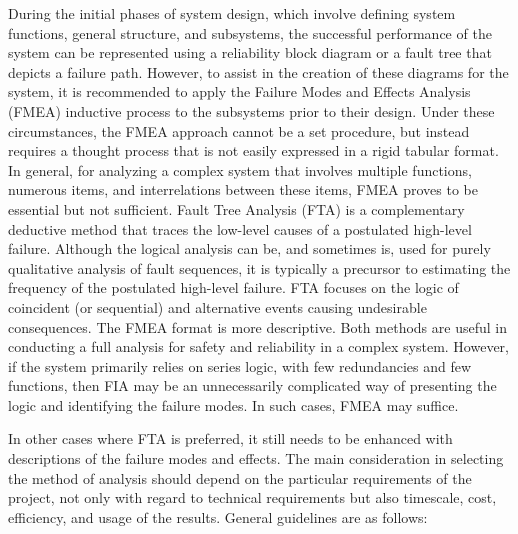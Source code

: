 \documentclass[./dissertation.tex]{subfiles}
\begin{document}
During the initial phases of system design, which involve defining system functions, general structure, and subsystems, the successful performance of the system can be represented using a reliability block diagram or a fault tree that depicts a failure path. However, to assist in the creation of these diagrams for the system, it is recommended to apply the Failure Modes and Effects Analysis (FMEA) inductive process to the subsystems prior to their design. Under these circumstances, the FMEA approach cannot be a set procedure, but instead requires a thought process that is not easily expressed in a rigid tabular format. In general, for analyzing a complex system that involves multiple functions, numerous items, and interrelations between these items, FMEA proves to be essential but not sufficient. Fault Tree Analysis (FTA) is a complementary deductive method that traces the low-level causes of a postulated high-level failure. Although the logical analysis can be, and sometimes is, used for purely qualitative analysis of fault sequences, it is typically a precursor to estimating the frequency of the postulated high-level failure. FTA focuses on the logic of coincident (or sequential) and alternative events causing undesirable consequences. The FMEA format is more descriptive. Both methods are useful in conducting a full analysis for safety and reliability in a complex system. However, if the system primarily relies on series logic, with few redundancies and few functions, then FIA may be an unnecessarily complicated way of presenting the logic and identifying the failure modes. In such cases, FMEA may suffice.

In other cases where FTA is preferred, it still needs to be enhanced with descriptions of the failure modes and effects. The main consideration in selecting the method of analysis should depend on the particular requirements of the project, not only with regard to technical requirements but also timescale, cost, efficiency, and usage of the results. General guidelines are as follows:
\end{document}
